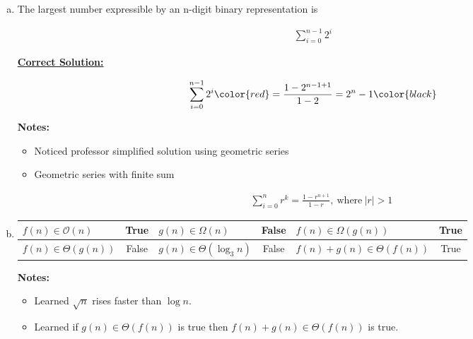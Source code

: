 \documentclass[12pt]{article}
\begin{document}
\begin{enumerate}[a.]
    \item The largest number expressible by an n-digit binary representation is

    \setcounter{equation}{0}
    \begin{align}
        \sum\limits_{i=0}^{n-1} 2^i
    \end{align}

    \begin{mdframed}
        \underline{\textbf{Correct Solution:}}

        \setcounter{equation}{0}
        \begin{align}
            \sum\limits_{i=0}^{n-1} 2^i \color{red}= \frac{1 - 2^{n-1+1}}{1-2} = 2^n-1\color{black}
        \end{align}
    \end{mdframed}

    \bigskip

    \textbf{Notes:}

    \begin{itemize}
        \item Noticed professor simplified solution using geometric series
        \item Geometric series with finite sum

        \begin{align}
            \sum\limits_{i=0}^{n} r^k = \frac{1-r^{n+1}}{1-r},\:\text{where}\:\lvert r \rvert > 1
        \end{align}
    \end{itemize}

    \item

    \begin{tabular}{|l|c|l|c|l|c|}
        \hline
        $f(n) \in \mathcal{O}(n)$ & True & $g(n) \in \Omega(n)$ & False & $f(n) \in \Omega(g(n))$ & True\\
        \hline
        $f(n) \in \Theta(g(n))$ & False & $g(n) \in \Theta(\log_3 n)$ & False & $f(n) + g(n) \in \Theta(f(n))$ & True\\
        \hline
    \end{tabular}

    \bigskip

    \textbf{Notes:}

    \begin{itemize}
        \item Learned $\sqrt{n}$ rises faster than $\log n$.
        \item Learned if $g(n) \in \Theta(f(n))$ is true then
        $f(n) + g(n) \in \Theta(f(n))$ is true.
    \end{itemize}


\end{enumerate}
\end{document}
